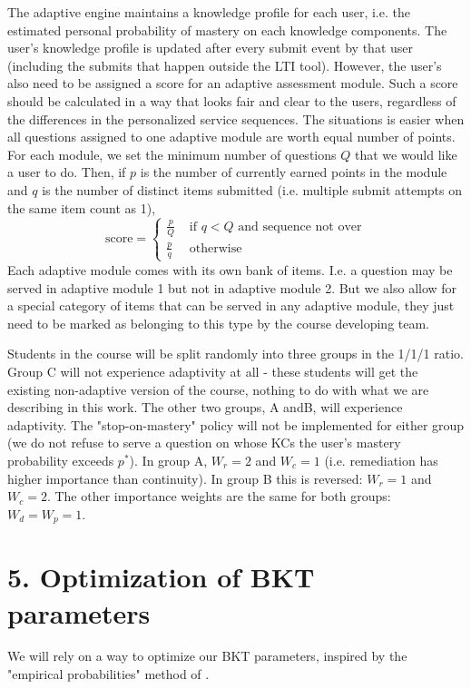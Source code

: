 \documentclass{sigchi}
\newcommand{\1}{\mathbf{1}}
\newcommand{\be}{\begin{equation}}
\newcommand{\ee}{\end{equation}}
\begin{document}
The adaptive engine maintains a knowledge profile for each user, i.e. the estimated personal probability of mastery on each knowledge components. The user's knowledge profile is updated after every submit event by that user (including the submits that happen outside the LTI tool). However, the user's also need to be assigned a score for an adaptive assessment module. Such a score should be calculated in a way that looks fair and clear to the users, regardless of the differences in the personalized service sequences. The situations is easier when all questions assigned to one adaptive module are worth equal number of points. For each module, we set the minimum number of questions $Q$ that we would like a user to do. Then, if $p$ is the number of currently earned points in the module and $q$ is the number of distinct items submitted (i.e. multiple submit attempts on the same item count as 1),
\be \textrm{score}=\left\{
\begin{matrix}
\frac{p}{Q} & \textrm{ if }q<Q\textrm{ and sequence not over}\\
\frac{p}{q} & \textrm{ otherwise}
\end{matrix}
\right.
\ee
Each adaptive module comes with its own bank of items. I.e. a question may be served in adaptive module 1 but not in adaptive module 2. But we also allow for a special category of items that can be served in any adaptive module, they just need to be marked as belonging to this type by the course developing team.

Students in the course will be split randomly into three groups in the 1/1/1 ratio. Group C will not experience adaptivity at all - these students will get the existing non-adaptive version of the course, nothing to do with what we are describing in this work. The other two groups, A andB, will experience adaptivity. The "stop-on-mastery" policy will not be implemented for either group (we do not refuse to serve a question on whose KCs the user's mastery probability exceeds $p^*$). In group A, $W_r=2$ and $W_c=1$ (i.e. remediation has higher importance than continuity). In group B this is reversed: $W_r=1$ and $W_c=2$. The other importance weights are the same for both groups: $W_d=W_p=1$. 


\section{5. Optimization of BKT parameters}
\label{sec:optimization}
We will rely on a way to optimize our BKT parameters, inspired by the "empirical probabilities" method of \cite{hawkins2014learning}.
\end{document}
